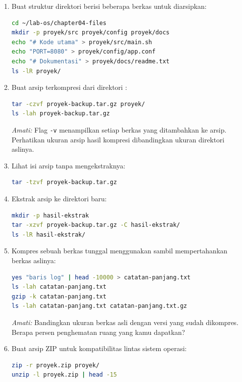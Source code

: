 \begin{enumerate}
    \item Buat struktur direktori berisi beberapa berkas untuk diarsipkan:
\begin{lstlisting}[language=bash, caption={Menyiapkan direktori yang akan diarsipkan}]
cd ~/lab-os/chapter04-files
mkdir -p proyek/src proyek/config proyek/docs
echo "# Kode utama" > proyek/src/main.sh
echo "PORT=8080" > proyek/config/app.conf
echo "# Dokumentasi" > proyek/docs/readme.txt
ls -lR proyek/
\end{lstlisting}

    \item Buat arsip terkompresi dari direktori :
\begin{lstlisting}[language=bash, caption={Membuat arsip .tar.gz}]
tar -czvf proyek-backup.tar.gz proyek/
ls -lah proyek-backup.tar.gz
\end{lstlisting}
    \textit{Amati:} Flag \texttt{-v} menampilkan setiap berkas yang ditambahkan ke arsip. Perhatikan ukuran arsip hasil kompresi dibandingkan ukuran direktori aslinya.

    \item Lihat isi arsip tanpa mengekstraknya:
\begin{lstlisting}[language=bash, caption={Melihat isi arsip tanpa ekstrak}]
tar -tzvf proyek-backup.tar.gz
\end{lstlisting}

    \item Ekstrak arsip ke direktori baru:
\begin{lstlisting}[language=bash, caption={Mengekstrak arsip ke direktori lain}]
mkdir -p hasil-ekstrak
tar -xzvf proyek-backup.tar.gz -C hasil-ekstrak/
ls -lR hasil-ekstrak/
\end{lstlisting}

    \item Kompres sebuah berkas tunggal menggunakan  sambil mempertahankan berkas aslinya:
\begin{lstlisting}[language=bash, caption={Kompresi berkas tunggal dengan gzip}]
yes "baris log" | head -10000 > catatan-panjang.txt
ls -lah catatan-panjang.txt
gzip -k catatan-panjang.txt
ls -lah catatan-panjang.txt catatan-panjang.txt.gz
\end{lstlisting}
    \textit{Amati:} Bandingkan ukuran berkas asli dengan versi yang sudah dikompres. Berapa persen penghematan ruang yang kamu dapatkan?

    \item Buat arsip ZIP untuk kompatibilitas lintas sistem operasi:
\begin{lstlisting}[language=bash, caption={Membuat arsip ZIP}]
zip -r proyek.zip proyek/
unzip -l proyek.zip | head -15
\end{lstlisting}
\end{enumerate}

